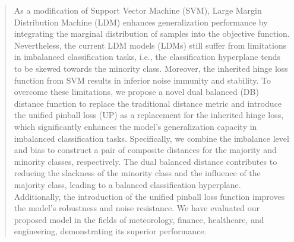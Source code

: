 \documentclass[a4paper]{cas-sc}
\begin{document}
\begin{abstract}
As a modification of Support Vector Machine (SVM), Large Margin Distribution Machine (LDM) enhances generalization performance by integrating the marginal distribution of samples into the objective function. Nevertheless, the current LDM models (LDMs) still suffer from limitations in imbalanced classification tasks, i.e., the classification hyperplane tends to be skewed towards the minority class. Moreover, the inherited hinge loss function from SVM results in inferior noise immunity and stability. To overcome these limitations, we propose a novel dual balanced (DB) distance function to replace the traditional distance metric and introduce the unified pinball loss (UP) as a replacement for the inherited hinge loss, which significantly enhances the model's generalization capacity in imbalanced classification tasks. Specifically, we combine the imbalance level and bias to construct a pair of composite distances for the majority and minority classes, respectively. The dual balanced distance contributes to reducing the slackness of the minority class and the influence of the majority class, leading to a balanced classification hyperplane. Additionally, the introduction of the unified pinball loss function improves the model's robustness and noise resistance. We have evaluated our proposed model in the fields of meteorology, finance, healthcare, and engineering, demonstrating its superior performance.


\end{abstract}
\end{document}

